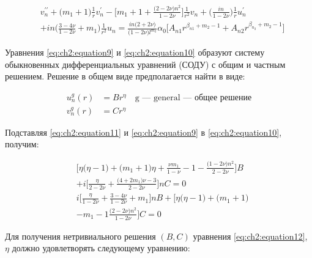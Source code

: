 \begin{equation}
\label{eq:ch2:equation10}
\begin{split}
	&v_n^{\prime\prime} + \big ( m_1 + 1 \big ) \frac{1}{r} v_n^{\prime} - \big [ m_1 + 1 + \frac{\big (2-2\nu \big )n^2}{1-2\nu} \big ] \frac{1}{r^2}v_n + \big(\frac{in}{1-2\nu} \big)\frac{1}{r}u_n^{\prime}\\
&+ in \big (\frac{3-4\nu}{1-2\nu} + m_1 \big ) \frac{1}{r^2} u_n = \frac{in \big (2+2\nu \big)}{\big (1-2\nu \big) l^{m_2}} \alpha_0 \big [ A_{n1} r^{\beta_{n1}+m_2-1} + A_{n2} r^{\beta_{n_2}+m_2 -1}\big ]
\end{split}
\end{equation}

Уравнения \cref{eq:ch2:equation9} и \cref{eq:ch2:equation10} образуют систему обыкновенных дифференциальных уравнений (СОДУ) с общим и частным решением. Решение в общем виде предполагается найти в виде:

\begin{equation}
\label{eq:ch2:equation11}
\begin{split}
	u_n^g(r) &= Br^{\eta} \quad \text{g --- general --- общее решение}\\
	v_n^g(r) &= Cr^{\eta}
\end{split}
\end{equation}

Подставляя \cref{eq:ch2:equation11} и \cref{eq:ch2:equation9} в \cref{eq:ch2:equation10}, получим:

\begin{equation}
\label{eq:ch2:equation12}
\begin{split}
	&\big [ \eta \big (\eta-1 \big) + \big (m_1 +1 \big) \eta + \frac{\nu m_1}{1-\nu} - 1 -\frac{ \big (1-2\nu \big)n^2}{2-2\nu} \big ] B \\
&+ i \big [\frac{\eta}{2-2\nu} + \frac{\big (4+2m_1 \big ) \nu -3 }{2-2\nu}  \big ] n C=0\\
&i \big [\frac{\eta}{1-2\nu} + \frac{3-4\nu}{1-2\nu} + m_1 \big ]nB+\big [ \eta \big ( \eta-1\big ) + \big (m_1 +1 \big ) \\
&- m_1 -1 \frac{\big (2-2\nu \big ) n^2}{1-2\nu} \big ] C=0
\end{split}
\end{equation}

Для получения нетривиального решения \( (B, C) \) уравнения \cref{eq:ch2:equation12}, \( \eta \) должно удовлетворять следующему уравнению:

